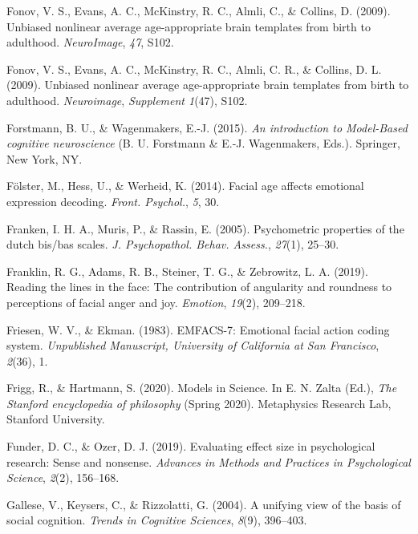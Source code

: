 \documentclass[11pt,american,a4paper,oneside,]{memoir} %
\begin{document}
\leavevmode\hypertarget{ref-fonov2009unbiased}{}%
Fonov, V. S., Evans, A. C., McKinstry, R. C., Almli, C., \& Collins, D. (2009). Unbiased nonlinear average age-appropriate brain templates from birth to adulthood. \emph{NeuroImage}, \emph{47}, S102.

\leavevmode\hypertarget{ref-Fonov2009-sr}{}%
Fonov, V. S., Evans, A. C., McKinstry, R. C., Almli, C. R., \& Collins, D. L. (2009). Unbiased nonlinear average age-appropriate brain templates from birth to adulthood. \emph{Neuroimage}, \emph{Supplement 1}(47), S102.

\leavevmode\hypertarget{ref-Forstmann2015-rz}{}%
Forstmann, B. U., \& Wagenmakers, E.-J. (2015). \emph{An introduction to Model-Based cognitive neuroscience} (B. U. Forstmann \& E.-J. Wagenmakers, Eds.). Springer, New York, NY.

\leavevmode\hypertarget{ref-Folster2014-zy}{}%
Fölster, M., Hess, U., \& Werheid, K. (2014). Facial age affects emotional expression decoding. \emph{Front. Psychol.}, \emph{5}, 30.

\leavevmode\hypertarget{ref-Franken2005-jg}{}%
Franken, I. H. A., Muris, P., \& Rassin, E. (2005). Psychometric properties of the dutch bis/bas scales. \emph{J. Psychopathol. Behav. Assess.}, \emph{27}(1), 25--30.

\leavevmode\hypertarget{ref-Franklin2019-qo}{}%
Franklin, R. G., Adams, R. B., Steiner, T. G., \& Zebrowitz, L. A. (2019). Reading the lines in the face: The contribution of angularity and roundness to perceptions of facial anger and joy. \emph{Emotion}, \emph{19}(2), 209--218.

\leavevmode\hypertarget{ref-Friesen1983-ft}{}%
Friesen, W. V., \& Ekman. (1983). EMFACS-7: Emotional facial action coding system. \emph{Unpublished Manuscript, University of California at San Francisco}, \emph{2}(36), 1.

\leavevmode\hypertarget{ref-Frigg2020-hp}{}%
Frigg, R., \& Hartmann, S. (2020). Models in Science. In E. N. Zalta (Ed.), \emph{The Stanford encyclopedia of philosophy} (Spring 2020). Metaphysics Research Lab, Stanford University.

\leavevmode\hypertarget{ref-Funder2019-ow}{}%
Funder, D. C., \& Ozer, D. J. (2019). Evaluating effect size in psychological research: Sense and nonsense. \emph{Advances in Methods and Practices in Psychological Science}, \emph{2}(2), 156--168.

\leavevmode\hypertarget{ref-gallese2004unifying}{}%
Gallese, V., Keysers, C., \& Rizzolatti, G. (2004). A unifying view of the basis of social cognition. \emph{Trends in Cognitive Sciences}, \emph{8}(9), 396--403.
\end{document}
